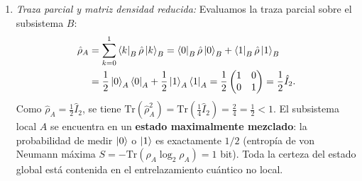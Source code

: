 \begin{appendices}
\begin{enumerate}
\begin{equation}
\begin{pmatrix}
            0 & 0 & 0 & 0 \\
            1 & 0 & 0 & 1
        \end{pmatrix}.
    \end{equation}
    \item \textit{Traza parcial y matriz densidad reducida:}
    Evaluamos la traza parcial sobre el subsistema $B$:
    \begin{align}
        \hat{\rho}_A &= \sum_{k=0}^1 \left\langle k \right|_B \hat{\rho} \left| k \right\rangle_B = \left\langle 0 \right|_B \hat{\rho} \left| 0 \right\rangle_B + \left\langle 1 \right|_B \hat{\rho} \left| 1 \right\rangle_B \nonumber\\
        &= \frac{1}{2}\left| 0 \right\rangle_A\left\langle 0 \right|_A + \frac{1}{2}\left| 1 \right\rangle_A\left\langle 1 \right|_A = \frac{1}{2}\begin{pmatrix} 1 & 0 \\ 0 & 1 \end{pmatrix} = \frac{1}{2}\hat{I}_2.
    \end{align}
    Como $\hat{\rho}_A = \frac{1}{2}\hat{I}_2$, se tiene $\mathrm{Tr}(\hat{\rho}_A^2) = \mathrm{Tr}\left(\frac{1}{4}\hat{I}_2\right) = \frac{2}{4} = \frac{1}{2} < 1$. El subsistema local $A$ se encuentra en un \textbf{estado maximalmente mezclado}: la probabilidad de medir $\left| 0 \right\rangle$ o $\left| 1 \right\rangle$ es exactamente $1/2$ (entropía de von Neumann máxima $S = -\mathrm{Tr}(\rho_A \log_2 \rho_A) = 1$ bit). Toda la certeza del estado global está contenida en el entrelazamiento cuántico no local.
\end{enumerate}

\end{appendices}
